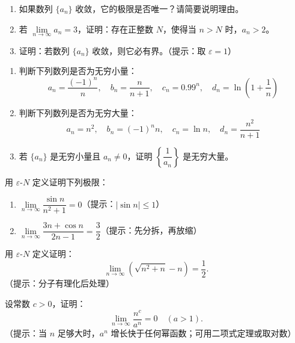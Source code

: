 \documentclass{ctexart}
\begin{document}
\begin{exercise}
\begin{enumerate}
\item 如果数列 \(\{a_n\}\) 收敛，它的极限是否唯一？请简要说明理由。
\item 若 \(\lim\limits_{n\to\infty} a_n = 3\)，证明：存在正整数 \(N\)，使得当 \(n > N\) 时，\(a_n > 2\)。
\item 证明：若数列 \(\{a_n\}\) 收敛，则它必有界。（提示：取 \(\varepsilon = 1\)）
\end{enumerate}
\end{exercise}

\begin{exercise}
\begin{enumerate}
\item 判断下列数列是否为无穷小量：
   \[
   a_n = \dfrac{(-1)^n}{n},\quad b_n = \dfrac{n}{n+1},\quad c_n = 0.99^n,\quad d_n = \ln\left(1+\dfrac{1}{n}\right)
   \]
\item 判断下列数列是否为无穷大量：
   \[
   a_n = n^2,\quad b_n = (-1)^n n,\quad c_n = \ln n,\quad d_n = \dfrac{n^2}{n+1}
   \]
\item 若 \(\{a_n\}\) 是无穷小量且 \(a_n \neq 0\)，证明 \(\left\{\dfrac{1}{a_n}\right\}\) 是无穷大量。
\end{enumerate}
\end{exercise}

\begin{exercise}
用 \(\varepsilon\)-\(N\) 定义证明下列极限：
\begin{enumerate}
\item \(\lim\limits_{n\to\infty} \dfrac{\sin n}{n^2 + 1} = 0\)（提示：\(|\sin n| \leq 1\)）
\item \(\lim\limits_{n\to\infty} \dfrac{3n + \cos n}{2n - 1} = \dfrac{3}{2}\)（提示：先分拆，再放缩）
\end{enumerate}
\end{exercise}

\begin{exercise}
用 \(\varepsilon\)-\(N\) 定义证明：
\[
\lim_{n\to\infty} \left(\sqrt{n^2 + n} - n\right) = \dfrac{1}{2}.
\]
（提示：分子有理化后处理）
\end{exercise}

\begin{exercise}
设常数 \(c > 0\)，证明：
\[
\lim_{n\to\infty} \dfrac{n^c}{a^n} = 0 \quad (a > 1).
\]
（提示：当 \(n\) 足够大时，\(a^n\) 增长快于任何幂函数；可用二项式定理或取对数）
\end{exercise}
\end{document}
